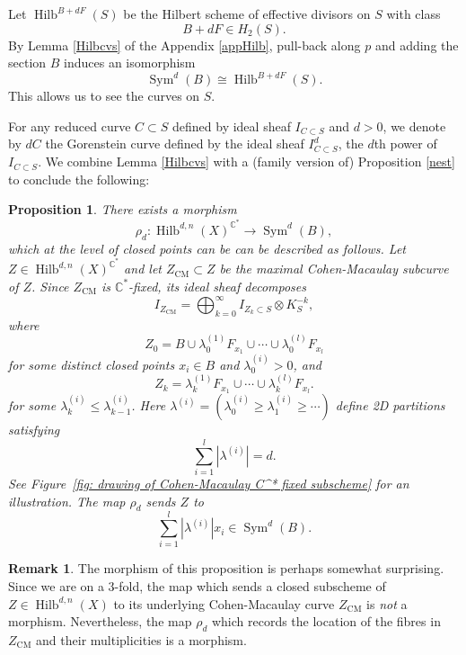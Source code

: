 \documentclass{amsart}
\newtheorem{proposition}[theorem]{Proposition}
\theoremstyle{definition}
\newtheorem{remark}[theorem]{Remark}
\newcommand{\CC} {\mathbb{C}}          %
\newcommand{\Sym}{\operatorname{Sym}}
\newcommand{\Hilb}{\operatorname{Hilb}}
\newcommand{\CM}{\operatorname{CM}}
\begin{document}
Let $\Hilb^{B+dF}(S)$ be the Hilbert scheme of effective divisors on $S$ with class $$B+dF \in H_2(S).$$ By Lemma \ref{Hilbcvs} of the Appendix \ref{appHilb}, pull-back along $p$ and adding the section $B$ induces an isomorphism
$$
\Sym^d(B) \cong \Hilb^{B+dF}(S).
$$
This allows us to see the curves on $S$. 

For any reduced curve $C \subset S$ defined by ideal sheaf $I_{C \subset S}$ and $d >0$, we denote by $dC$ the Gorenstein curve defined by the ideal sheaf $I_{C \subset S}^d$, the $d$th power of $I_{C \subset S}$. We combine Lemma \ref{Hilbcvs} with a (family version of) Proposition \ref{nest} to conclude the following:
\begin{proposition} \label{proprho}
There exists a morphism
$$
\rho_d : \Hilb^{d,n}(X)^{\CC^*} \longrightarrow \Sym^d(B), 
$$
which at the level of closed points can be can be described as follows. Let $Z \in \Hilb^{d,n}(X)^{\CC^*}$ and let $Z_{\CM} \subset Z$ be the maximal Cohen-Macaulay subcurve of $Z$. Since $Z_{\CM}$ is $\CC^*$-fixed, its ideal sheaf decomposes
$$
I_{Z_{\CM}} = \bigoplus_{k=0}^{\infty} I_{Z_k \subset S} \otimes K_{S}^{-k},
$$
where 
$$
Z_0 = B \cup \lambda_{0}^{(1)} F_{x_1} \cup \cdots \cup \lambda_{0}^{(l)} F_{x_l}
$$
for some distinct closed points $x_i \in B$ and $\lambda_{0}^{(i)} > 0$, and
$$
Z_k = \lambda_{k}^{(1)} F_{x_1} \cup \cdots \cup \lambda_{k}^{(l)} F_{x_l}.
$$
for some $\lambda_{k}^{(i)} \leq \lambda_{k-1}^{(i)}$. Here $\lambda^{(i)} = (\lambda^{(i)}_{0} \geq \lambda^{(i)}_{1} \geq \cdots)$ define 2D partitions satisfying 
$$
\sum_{i=1}^{l} |\lambda^{(i)}| = d.
$$
See Figure~\ref{fig: drawing of Cohen-Macaulay C^* fixed subscheme}
for an illustration. The map $\rho_d$ sends $Z$ to 
$$
\sum_{i=1}^{l} |\lambda^{(i)}| x_i \in \Sym^d(B).
$$
\end{proposition}

\begin{remark}
The morphism of this proposition is perhaps somewhat surprising. Since we are on a 3-fold, the map which sends a closed subscheme of $Z \in \Hilb^{d,n}(X)$ to its underlying Cohen-Macaulay curve $Z_{\CM}$ is \emph{not} a morphism. Nevertheless, the map $\rho_d$ which records the location of the fibres in $Z_{\CM}$ and their multiplicities is a morphism.
\end{remark}
\end{document}
